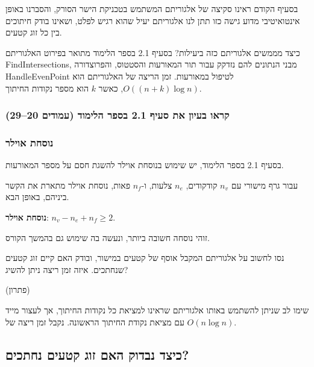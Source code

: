 \documentclass[
]{book}
\begin{document}
בסעיף הקודם ראינו סקיצה של אלגוריתם המשתמש בטכניקת הישר הסורק, והסברנו
באופן אינטואיטיבי מדוע גישה כזו תתן לנו אלגוריתם יעיל שהוא רגיש לפלט,
ושאינו בודק חיתוכים בין כל זוג קטעים.

כיצד מממשים אלגוריתם כזה ביעילות? בסעיף 2.1 בספר הלימוד מתואר בפירוט
האלגוריתם FindIntersections, מבני הנתונים להם נזדקק עבור תור המאורעות
והסטטוס, והפרוצדורה HandleEvenPoint לטיפול במאורעות. זמן הריצה של
האלגוריתם הוא \(O((n+k)\log n)\), כאשר \(k\) הוא מספר נקודות החיתוך.

\hypertarget{ux5e7ux5e8ux5d0ux5d5-ux5d1ux5e2ux5d9ux5d5ux5df-ux5d0ux5ea-ux5e1ux5e2ux5d9ux5e3-2.1-ux5d1ux5e1ux5e4ux5e8-ux5d4ux5dcux5d9ux5deux5d5ux5d3-ux5e2ux5deux5d5ux5d3ux5d9ux5dd-2029}{%
\subsubsection*{קראו בעיון את סעיף 2.1 בספר הלימוד (עמודים 20--29)}\label{ux5e7ux5e8ux5d0ux5d5-ux5d1ux5e2ux5d9ux5d5ux5df-ux5d0ux5ea-ux5e1ux5e2ux5d9ux5e3-2.1-ux5d1ux5e1ux5e4ux5e8-ux5d4ux5dcux5d9ux5deux5d5ux5d3-ux5e2ux5deux5d5ux5d3ux5d9ux5dd-2029}}

\hypertarget{ux5e0ux5d5ux5e1ux5d7ux5ea-ux5d0ux5d5ux5d9ux5dcux5e8}{%
\subsubsection*{נוסחת אוילר}\label{ux5e0ux5d5ux5e1ux5d7ux5ea-ux5d0ux5d5ux5d9ux5dcux5e8}}

בסעיף 2.1 בספר הלימוד, יש שימוש בנוסחת אוילר להשגת חסם על מספר המאורעות.

עבור גרף מישורי עם \(n_v\) קודקודים, \(n_e\) צלעות, ו-\(n_f\) פאות, נוסחת
אוילר מתארת את הקשר ביניהם, באופן הבא.

\textbf{נוסחת אוילר}: \(n_v-n_e+n_f\ge 2\).

זוהי נוסחה חשובה ביותר, ונעשה בה שימוש גם בהמשך הקורס.

נסו לחשוב על אלגוריתם המקבל אוסף של קטעים במישור, ובודק האם קיים זוג
קטעים שנחתכים. איזה זמן ריצה ניתן להשיג?

(פתרון)

שימו לב שניתן להשתמש באותו אלגוריתם שראינו למציאת כל נקודות החיתוך, אך לעצור מייד עם מציאת נקודת החיתוך הראשונה.
נקבל זמן ריצה של \(O(n\log n)\).

\hypertarget{check-line-int}{%
\subsection{כיצד נבדוק האם זוג קטעים נחתכים?}\label{check-line-int}}
\end{document}
